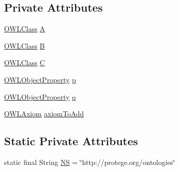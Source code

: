 \subsection*{Private Attributes}
\begin{DoxyCompactItemize}
\item 
\hyperlink{interfaceorg_1_1semanticweb_1_1owlapi_1_1model_1_1_o_w_l_class}{O\-W\-L\-Class} \hyperlink{classorg_1_1semanticweb_1_1owlapi_1_1api_1_1test_1_1axioms_1_1_three_equivalents_round_trip_test_case_ab031e92e066aefd32655dae340383184}{A}
\item 
\hyperlink{interfaceorg_1_1semanticweb_1_1owlapi_1_1model_1_1_o_w_l_class}{O\-W\-L\-Class} \hyperlink{classorg_1_1semanticweb_1_1owlapi_1_1api_1_1test_1_1axioms_1_1_three_equivalents_round_trip_test_case_adf35b593a67dc658c043df2964c2403d}{B}
\item 
\hyperlink{interfaceorg_1_1semanticweb_1_1owlapi_1_1model_1_1_o_w_l_class}{O\-W\-L\-Class} \hyperlink{classorg_1_1semanticweb_1_1owlapi_1_1api_1_1test_1_1axioms_1_1_three_equivalents_round_trip_test_case_a511ae7adcc5fb6a9540888f31522c24f}{C}
\item 
\hyperlink{interfaceorg_1_1semanticweb_1_1owlapi_1_1model_1_1_o_w_l_object_property}{O\-W\-L\-Object\-Property} \hyperlink{classorg_1_1semanticweb_1_1owlapi_1_1api_1_1test_1_1axioms_1_1_three_equivalents_round_trip_test_case_a09ae4dad45092c80ff7a70e04501324f}{p}
\item 
\hyperlink{interfaceorg_1_1semanticweb_1_1owlapi_1_1model_1_1_o_w_l_object_property}{O\-W\-L\-Object\-Property} \hyperlink{classorg_1_1semanticweb_1_1owlapi_1_1api_1_1test_1_1axioms_1_1_three_equivalents_round_trip_test_case_ac3e3092e011387a47674019748a58006}{q}
\item 
\hyperlink{interfaceorg_1_1semanticweb_1_1owlapi_1_1model_1_1_o_w_l_axiom}{O\-W\-L\-Axiom} \hyperlink{classorg_1_1semanticweb_1_1owlapi_1_1api_1_1test_1_1axioms_1_1_three_equivalents_round_trip_test_case_aade82299363635a8887cc143f21e684a}{axiom\-To\-Add}
\end{DoxyCompactItemize}
\subsection*{Static Private Attributes}
\begin{DoxyCompactItemize}
\item 
static final String \hyperlink{classorg_1_1semanticweb_1_1owlapi_1_1api_1_1test_1_1axioms_1_1_three_equivalents_round_trip_test_case_a329f74dac365160f82924d59f0a895fb}{N\-S} = \char`\"{}http\-://protege.\-org/ontologies\char`\"{}
\end{DoxyCompactItemize}


